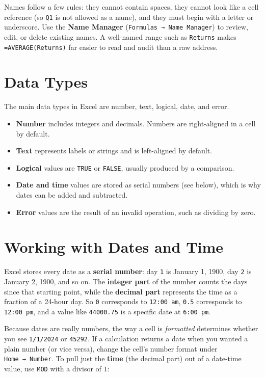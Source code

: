 \documentclass[
  11pt,
  letterpaper,
  DIV=11,
  numbers=noendperiod,
  oneside,
  open=any]{scrreprt}
\providecommand{\tightlist}{%
  \setlength{\itemsep}{0pt}\setlength{\parskip}{0pt}}\usepackage{longtable,booktabs,array}
\begin{document}
Names follow a few rules: they cannot contain spaces, they cannot look
like a cell reference (so \texttt{Q1} is not allowed as a name), and
they must begin with a letter or underscore. Use the \textbf{Name
Manager} (\texttt{Formulas\ →\ Name\ Manager}) to review, edit, or
delete existing names. A well-named range such as \texttt{Returns} makes
\texttt{=AVERAGE(Returns)} far easier to read and audit than a raw
address.

\section{Data Types}\label{data-types}

The main data types in Excel are number, text, logical, date, and error.

\begin{itemize}
\tightlist
\item
  \textbf{Number} includes integers and decimals. Numbers are
  right-aligned in a cell by default.
\item
  \textbf{Text} represents labels or strings and is left-aligned by
  default.
\item
  \textbf{Logical} values are \texttt{TRUE} or \texttt{FALSE}, usually
  produced by a comparison.
\item
  \textbf{Date and time} values are stored as serial numbers (see
  below), which is why dates can be added and subtracted.
\item
  \textbf{Error} values are the result of an invalid operation, such as
  dividing by zero.
\end{itemize}

\section{Working with Dates and Time}\label{working-with-dates-and-time}

Excel stores every date as a \textbf{serial number}: day \texttt{1} is
January 1, 1900, day \texttt{2} is January 2, 1900, and so on. The
\textbf{integer part} of the number counts the days since that starting
point, while the \textbf{decimal part} represents the time as a fraction
of a 24-hour day. So \texttt{0} corresponds to \texttt{12:00\ am},
\texttt{0.5} corresponds to \texttt{12:00\ pm}, and a value like
\texttt{44000.75} is a specific date at \texttt{6:00\ pm}.

Because dates are really numbers, the way a cell is \emph{formatted}
determines whether you see \texttt{1/1/2024} or \texttt{45292}. If a
calculation returns a date when you wanted a plain number (or vice
versa), change the cell's number format under \texttt{Home\ →\ Number}.
To pull just the \textbf{time} (the decimal part) out of a date-time
value, use \texttt{MOD} with a divisor of \(1\):
\end{document}
